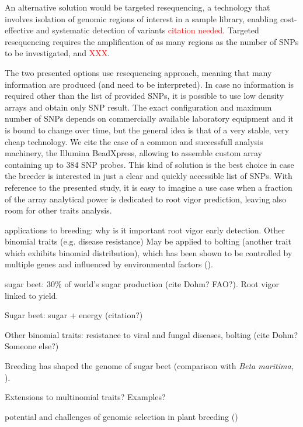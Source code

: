 An alternative solution would be targeted resequencing, a technology
that involves isolation of genomic regions of interest in a sample library, 
enabling cost-effective and systematic detection of variants \textcolor{red}{citation needed}. 
Targeted resequencing requires the amplification of as many regions as
the number of SNPs to be investigated, and \textcolor{red}{XXX}. 

The two presented options use resequencing approach, meaning that many 
information are produced (and need to be interpreted). In case no
information is required other than the list of provided SNPs, 
it is possible to use low density arrays and obtain only
SNP result. The exact configuration and maximum number of SNPs depends on
commercially available laboratory equipment and it is bound to change over
time, but the general idea is that of a very stable, very cheap technology.
We cite the case of a common and successfull analysis machinery,
the Illumina BeadXpress, allowing to assemble custom array containing up 
to 384 SNP probes. This kind of solution is the best choice in case
the breeder is interested in just a clear and quickly accessible list of SNPs.
With reference to the presented study, it is easy to imagine a use case when a fraction
of the array analytical power is dedicated to root vigor prediction, leaving
also room for other traits analysis.

applications to breeding:
why is it important root vigor early detection. Other binomial traits (e.g.
disease resistance) May be applied to bolting (another trait which
exhibits binomial distribution), which has been shown to be controlled
by multiple genes and influenced by environmental factors
(\cite{salah2012genetic}).

sugar beet: $30\%$ of world's sugar production (cite Dohm? FAO?). Root
vigor linked to yield.

Sugar beet: sugar + energy (citation?)

Other binomial traits: resistance to viral and fungal diseases, bolting
(cite Dohm? Someone else?)

Breeding has shaped the genome of sugar beet (comparison with \emph{Beta
  maritima}, \cite{dohm2013genome}).

Extensions to multinomial traits? Examples?

potential and challenges of genomic selection in plant breeding (\cite{jonas2013does})

%

